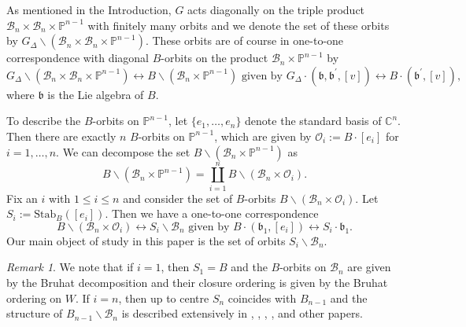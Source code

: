 \documentclass[12pt]{amsart}
\numberwithin{equation}{section}
\theoremstyle{remark}
\newtheorem{rem}[thm]{Remark}
\theoremstyle{definition}
\newcommand{\fg}{\mbox{${\mathfrak g}$}}
\newcommand{\fb}{\mbox{${\mathfrak b}$}}
\newcommand{\C}{\mbox{${\mathbb C}$}}
\newcommand{\B}{\mathcal{B}}
\begin{document}

As mentioned in the Introduction, $G$ acts diagonally on the triple product $\B_{n}\times\B_{n}\times \mathbb{P}^{n-1}$ with finitely many orbits and we denote the set of these orbits by $G_{\Delta}\backslash (\B_{n}\times\B_{n}\times\mathbb{P}^{n-1})$.  These orbits are of course in one-to-one correspondence with 
diagonal $B$-orbits on the product $\B_{n}\times \mathbb{P}^{n-1}$ by  %
\begin{equation}\label{eq:Gdeltacorres}
G_{\Delta}\backslash(\B_{n}\times\B_{n}\times\mathbb{P}^{n-1})\longleftrightarrow B\backslash (\B_{n}\times \mathbb{P}^{n-1}) \mbox{ given by } G_{\Delta}\cdot (\fb,\fb^{\prime},[v])\leftrightarrow B\cdot (\fb^{\prime}, [v]),
\end{equation}  
where $\fb$ is the Lie algebra of $B.$

To describe the $B$-orbits on $\mathbb{P}^{n-1}$, let $\{e_{1},\dots, e_{n}\}$ denote the standard basis of $\C^{n}$.  Then there are exactly $n$ $B$-orbits on $\mathbb{P}^{n-1}$, which are  given by $\mathcal{O}_{i}:=B\cdot[e_{i}]$ for $i=1,\dots, n$.  We can decompose the set $B\backslash (\B_{n}\times\mathbb{P}^{n-1})$ as
\begin{equation}\label{eq:orbitspacedecomp}
B\backslash (\B_{n}\times\mathbb{P}^{n-1})=\coprod_{i=1}^{n} B\backslash (\B_{n}\times\mathcal{O}_{i}).
\end{equation}
Fix an $i$ with $1\leq i \leq n$ and consider the set of $B$-orbits $B\backslash (\B_{n}\times\mathcal{O}_{i}).$  Let
$S_{i}:=\mbox{Stab}_{B}([e_{i}])$.  Then we have a one-to-one correspondence 
\begin{equation}\label{eq:Sicorres}
B\backslash (\B_{n}\times\mathcal{O}_{i})\longleftrightarrow S_{i}\backslash \B_{n} \mbox{ given by } B\cdot(\fb_1,[e_{i}])\longleftrightarrow S_{i}\cdot\fb_1.
\end{equation} 
Our main object of study in this paper is the set of orbits $S_{i}\backslash\B_{n}$.  
\begin{rem}\label{r:specialcase}
We note that if $i=1$, then $S_{1}=B$ and the $B$-orbits on $\B_{n}$ are given by the Bruhat decomposition and their closure ordering is given by the Bruhat ordering on $W$.  If $i=n$, then up to centre $S_{n}$ coincides with $B_{n-1}$ and the structure of $B_{n-1}\backslash\B_{n}$ is described extensively in \cite{Hashi}, \cite{CE21I}, \cite{CE21II}, \cite{Shpairs}, and other papers. 
\end{rem}
\end{document}
